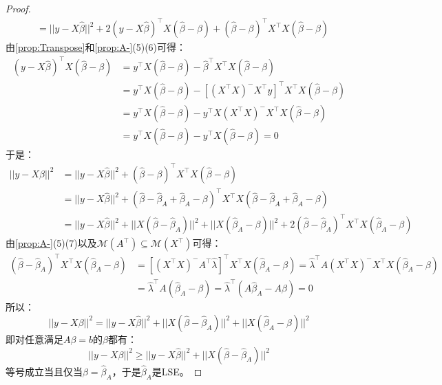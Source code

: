 \begin{proof}
\begin{align*}
		&=||y-X\hat{\beta}||^2+2(y-X\hat{\beta})^{\top}X(\hat{\beta}-\beta)+(\hat{\beta}-\beta)^{\top}X^{\top}X(\hat{\beta}-\beta)
	\end{align*}
	由\cref{prop:Transpose}和\cref{prop:A-}(5)(6)可得：
	\begin{align*}
		(y-X\hat{\beta})^{\top}X(\hat{\beta}-\beta)&=y^{\top}X(\hat{\beta}-\beta)-\hat{\beta}^{\top}X^{\top}X(\hat{\beta}-\beta) \\
		&=y^{\top}X(\hat{\beta}-\beta)-[(X^{\top}X)^-X^{\top}y]^{\top}X^{\top}X(\hat{\beta}-\beta) \\
		&=y^{\top}X(\hat{\beta}-\beta)-y^{\top}X(X^{\top}X)^-X^{\top}X(\hat{\beta}-\beta) \\
		&=y^{\top}X(\hat{\beta}-\beta)-y^{\top}X(\hat{\beta}-\beta)=0
	\end{align*}
	于是：
	\begin{align*}
		||y-X\beta||^2
		&=||y-X\hat{\beta}||^2+(\hat{\beta}-\beta)^{\top}X^{\top}X(\hat{\beta}-\beta) \\
		&=||y-X\hat{\beta}||^2+(\hat{\beta}-\hat{\beta}_A+\hat{\beta}_A-\beta)^{\top}X^{\top}X(\hat{\beta}-\hat{\beta}_A+\hat{\beta}_A-\beta) \\
		&=||y-X\hat{\beta}||^2+||X(\hat{\beta}-\hat{\beta}_A)||^2+||X(\hat{\beta}_A-\beta)||^2+2(\hat{\beta}-\hat{\beta}_A)^{\top}X^{\top}X(\hat{\beta}_A-\beta)
	\end{align*}
	由\cref{prop:A-}(5)(7)以及$\mathcal{M}(A^{\top})\subseteq\mathcal{M}(X^{\top})$可得：
	\begin{align*}
		(\hat{\beta}-\hat{\beta}_A)^{\top}X^{\top}X(\hat{\beta}_A-\beta)
		&=[(X^{\top}X)^-A^{\top}\hat{\lambda}]^{\top}X^{\top}X(\hat{\beta}_A-\beta)
		=\hat{\lambda}^{\top}A(X^{\top}X)^-X^{\top}X(\hat{\beta}_A-\beta) \\
		&=\hat{\lambda}^{\top}A(\hat{\beta}_A-\beta)
		=\hat{\lambda}^{\top}(A\hat{\beta}_A-A\beta)=0
	\end{align*}
	所以：
	\begin{equation*}
		||y-X\beta||^2=||y-X\hat{\beta}||^2+||X(\hat{\beta}-\hat{\beta}_A)||^2+||X(\hat{\beta}_A-\beta)||^2
	\end{equation*}
	即对任意满足$A\beta=b$的$\beta$都有：
	\begin{equation*}
		||y-X\beta||^2\geqslant||y-X\hat{\beta}||^2+||X(\hat{\beta}-\hat{\beta}_A)||^2
	\end{equation*}
	等号成立当且仅当$\beta=\hat{\beta}_A$，于是$\hat{\beta}_A$是LSE。
\end{proof}
